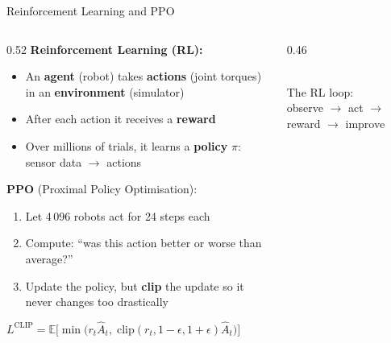 \documentclass[10pt,aspectratio=169]{beamer}
\begin{document}
\begin{frame}{Reinforcement Learning and PPO}
  \begin{columns}[T]
    \begin{column}{0.52\textwidth}
      \textbf{Reinforcement Learning (RL):}
      \begin{itemize}
        \item An \textbf{agent} (robot) takes \textbf{actions}
              (joint torques) in an \textbf{environment} (simulator)
        \item After each action it receives a \textbf{reward}
        \item Over millions of trials, it learns a \textbf{policy}
              $\pi$: sensor data $\rightarrow$ actions
      \end{itemize}

      \vspace{4pt}
      \textbf{PPO} (Proximal Policy Optimisation):
      \begin{enumerate}
        \item Let 4\,096 robots act for 24 steps each
        \item Compute: ``was this action better or worse than average?''
        \item Update the policy, but \textbf{clip} the update so it
              never changes too drastically
      \end{enumerate}
      \vspace{2pt}
      {\small
      $L^{\text{CLIP}} = \mathbb{E}\big[
        \min\!\big(r_t\hat{A}_t,\;
              \text{clip}(r_t, 1{-}\epsilon, 1{+}\epsilon)\hat{A}_t\big)
      \big]$}
    \end{column}
    \begin{column}{0.46\textwidth}
      \centering
      \vspace{6pt}\\
      {\scriptsize The RL loop:\\observe $\rightarrow$ act $\rightarrow$ reward $\rightarrow$ improve}


\end{column}
\end{columns}
\end{frame}
\end{document}

